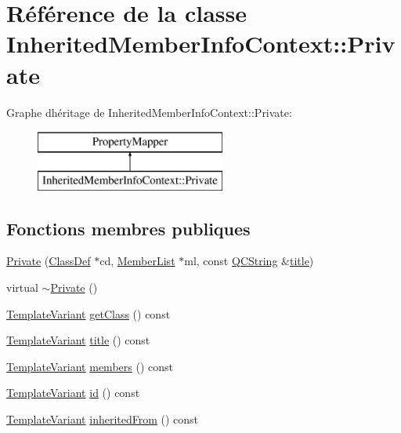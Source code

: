 \hypertarget{class_inherited_member_info_context_1_1_private}{}\section{Référence de la classe Inherited\+Member\+Info\+Context\+:\+:Private}
\label{class_inherited_member_info_context_1_1_private}
Graphe d\textquotesingle{}héritage de Inherited\+Member\+Info\+Context\+:\+:Private\+:\begin{figure}[H]
\begin{center}
\leavevmode
\includegraphics[height=2.000000cm]{class_inherited_member_info_context_1_1_private}
\end{center}
\end{figure}
\subsection*{Fonctions membres publiques}
\begin{DoxyCompactItemize}
\item 
\hyperlink{class_inherited_member_info_context_1_1_private_a010345156893089029a59b471e68ac4e}{Private} (\hyperlink{class_class_def}{Class\+Def} $\ast$cd, \hyperlink{class_member_list}{Member\+List} $\ast$ml, const \hyperlink{class_q_c_string}{Q\+C\+String} \&\hyperlink{class_inherited_member_info_context_1_1_private_a4a7c83306c799ce124ceaf208c4313a9}{title})
\item 
virtual \hyperlink{class_inherited_member_info_context_1_1_private_a74366f640c4022cf8c129958a2262bb2}{$\sim$\+Private} ()
\item 
\hyperlink{class_template_variant}{Template\+Variant} \hyperlink{class_inherited_member_info_context_1_1_private_a05d572b6ceb093591710b1ce3fdc1b2e}{get\+Class} () const 
\item 
\hyperlink{class_template_variant}{Template\+Variant} \hyperlink{class_inherited_member_info_context_1_1_private_a4a7c83306c799ce124ceaf208c4313a9}{title} () const 
\item 
\hyperlink{class_template_variant}{Template\+Variant} \hyperlink{class_inherited_member_info_context_1_1_private_ab4e9edc9ec9dcca2e9d59bde60a8dcd7}{members} () const 
\item 
\hyperlink{class_template_variant}{Template\+Variant} \hyperlink{class_inherited_member_info_context_1_1_private_a174dadacf13bea0fa02d4118d7016065}{id} () const 
\item 
\hyperlink{class_template_variant}{Template\+Variant} \hyperlink{class_inherited_member_info_context_1_1_private_a391cfc8463ea68e8ea0e66ba287d0f4d}{inherited\+From} () const 
\end{DoxyCompactItemize}


